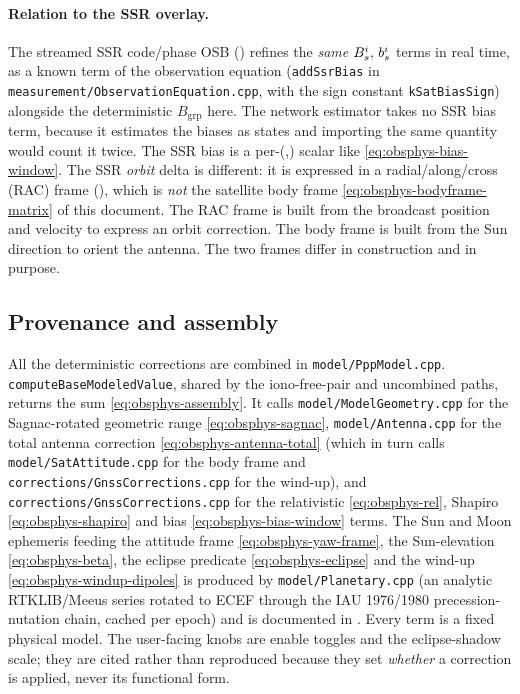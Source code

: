 \documentclass[main.tex]{subfiles}
\begin{document}
\paragraph{Relation to the SSR overlay.}
The streamed SSR code/phase OSB () refines the \emph{same} $B^i_s,\,b^i_s$ terms in
real time, as a known term of the observation equation
(\texttt{addSsrBias} in \texttt{measurement/ObservationEquation.cpp}, with
the sign constant \texttt{kSatBiasSign}) alongside the deterministic
$B_{\mathrm{grp}}$ here.  The network estimator takes no SSR bias term,
because it estimates the biases as states and importing the same quantity
would count it twice.  The SSR bias is a per-(\sat,\sigl) scalar like
\eqref{eq:obsphys-bias-window}.  The SSR \emph{orbit} delta is different:
it is expressed in a radial/along/cross (RAC) frame
(), which is
\emph{not} the satellite body frame \eqref{eq:obsphys-bodyframe-matrix}
of this document.  The RAC frame is built from the broadcast position
and velocity to express an orbit correction.  The body frame is built
from the Sun direction to orient the antenna.  The two frames differ in
construction and in purpose.

\subsection{Provenance and assembly}\label{sec:obsphys-provenance}

All the deterministic corrections are combined in
\texttt{model/PppModel.cpp}.  \texttt{computeBaseModeledValue}, shared by
the iono-free-pair and uncombined paths, returns the sum
\eqref{eq:obsphys-assembly}.  It calls
\texttt{model/ModelGeometry.cpp} for the Sagnac-rotated geometric range
\eqref{eq:obsphys-sagnac}, \texttt{model/Antenna.cpp} for the total
antenna correction \eqref{eq:obsphys-antenna-total} (which in turn calls
\texttt{model/SatAttitude.cpp} for the body frame and
\texttt{corrections/GnssCorrections.cpp} for the wind-up), and
\texttt{corrections/GnssCorrections.cpp} for the relativistic
\eqref{eq:obsphys-rel}, Shapiro \eqref{eq:obsphys-shapiro} and bias
\eqref{eq:obsphys-bias-window} terms.  The Sun and Moon ephemeris feeding
the attitude frame \eqref{eq:obsphys-yaw-frame}, the Sun-elevation
\eqref{eq:obsphys-beta}, the eclipse predicate
\eqref{eq:obsphys-eclipse} and the wind-up
\eqref{eq:obsphys-windup-dipoles} is produced by
\texttt{model/Planetary.cpp} (an analytic RTKLIB/Meeus series rotated to
ECEF through the IAU 1976/1980 precession-nutation chain, cached per epoch)
and is documented in
.  Every
term is a fixed physical model.  The user-facing knobs are enable toggles
and the eclipse-shadow scale; they are cited rather than reproduced because
they set \emph{whether} a correction is applied, never its functional form.

\ifSubfilesClassLoaded{\printbibliography}{}
\end{document}
